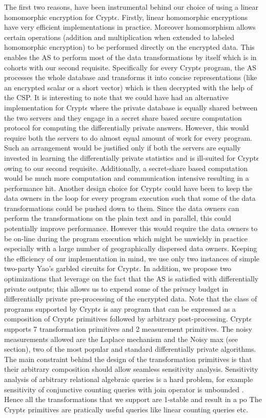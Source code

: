 The first two reasons, have been instrumental behind our choice of using a linear homomorphic encryption for Crypt$\epsilon$. Firstly, linear homomorphic encryptions have very efficient implementations in practice. Moreover homomorphism allows certain operations (addition and multiplication when extended to labeled homomorphic encryption) to be performed directly on the encrypted data. This enables the AS to perform most of the data transformations by itself which is in cohorts with our second requisite. Specifically for every Crypt$\epsilon$ program, the AS processes the whole database and transforms it into concise representations (like an encrypted scalar or a short vector) which is then decrypted with the help of the CSP. It is interesting to note that we could have had an alternative implementation for Crypt$\epsilon$ where the private database is equally shared between the two servers and they engage in a secret share based secure computation protocol for computing the differentially private answers. However, this would require both the servers to do almost equal amount of work for every program. Such an arrangement would be justified only if both the servers are equally invested in learning the differentially private statistics and is ill-suited for Crypt$\epsilon$ owing to our second requisite. Additionally, a secret-share based computation would be much more computation and communication intensive resulting in a performance hit. Another design choice for Crypt$\epsilon$ could have been to keep the data owners in the loop for every program execution such that some of the data transformations could be pushed down to them. Since the data owners can perform the transformations on the plain text and in parallel, this could potentially improve performance. However this would require the data owners to be on-line during the program execution which might be unwieldy in practice especially with a large number of geographically dispersed data owners.  Keeping the efficiency of our implementation in mind, we use only two instances of simple two-party Yao's garbled circuits for Crypt$\epsilon$. In addition, we propose two optimizations that leverage on the fact that the AS is satisfied with differentially private outputs; this allows  us to expend some of the privacy budget in differentially private pre-processing of the encrypted data. Note that the class of programs supported by Crypt$\epsilon$ is any program that can be expressed as a composition of  Crypt$\epsilon$ primitives followed by arbitrary post-processing. Crypt$\epsilon$ supports 7 transformation primitives and 2 measurement primitives. The noisy measurements allowed are the Laplace mechanism and the Noisy max (see section), two of the most popular and standard differentially private algorithms. The main constraint behind the design of the transformation primitives is that their arbitrary composition should allow seamless sensitivity analysis.  Sensitivity analysis of arbitrary relational algebraic queries is a hard problem, for example sensitivity of conjunctive counting queries with join operator is unbounded \cite{}. Hence all the transformations that we support are 1-stable and result in a po The Crypt$\epsilon$ primitives are  pratically useful queries like linear counting queries etc. 
